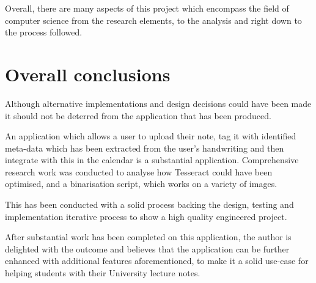 Overall, there are many aspects of this project which encompass the field of computer science from the research elements, to the analysis  and right down to the process followed.

\section{Overall conclusions}
Although alternative implementations and design decisions could have been made it should not be deterred from the application that has been produced.


An application which allows a user to upload their note, tag it with identified meta-data which has been extracted from the user's handwriting and then integrate with this in the calendar is a substantial application. Comprehensive research work was conducted to analyse how Tesseract could have been optimised, and a binarisation script, which works on a variety of images.

This has been conducted with a solid process backing the design, testing and implementation iterative process to show a high quality engineered project.

After substantial work has been completed on this application, the author is delighted with the outcome and believes that the application can be further enhanced with additional features aforementioned, to make it a solid use-case for helping students with their University lecture notes.
